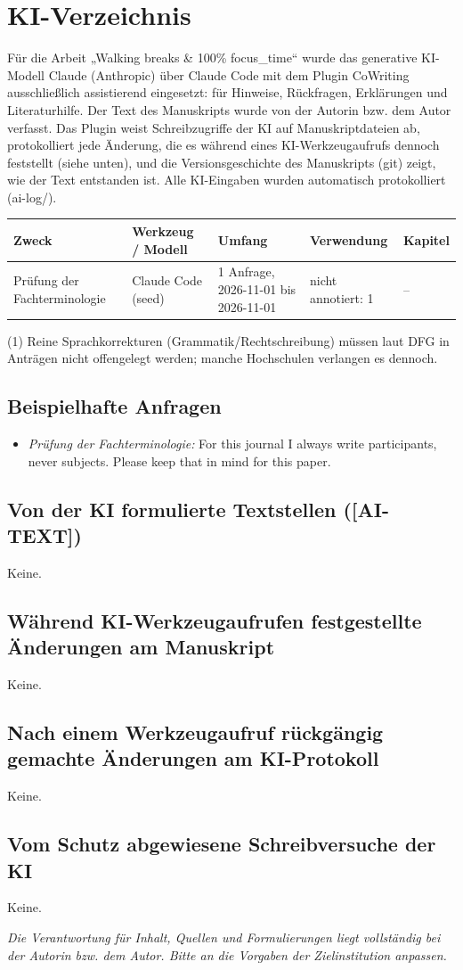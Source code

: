 \section*{KI-Verzeichnis}

Für die Arbeit „Walking breaks \& 100\% focus\_time“ wurde das generative KI-Modell Claude (Anthropic) über Claude Code mit dem Plugin CoWriting ausschließlich assistierend eingesetzt: für Hinweise, Rückfragen, Erklärungen und Literaturhilfe. Der Text des Manuskripts wurde von der Autorin bzw. dem Autor verfasst. Das Plugin weist Schreibzugriffe der KI auf Manuskriptdateien ab, protokolliert jede Änderung, die es während eines KI-Werkzeugaufrufs dennoch feststellt (siehe unten), und die Versionsgeschichte des Manuskripts (git) zeigt, wie der Text entstanden ist. Alle KI-Eingaben wurden automatisch protokolliert (ai-log/).

\begin{tabular}{p{.22\linewidth}p{.18\linewidth}p{.2\linewidth}p{.2\linewidth}p{.1\linewidth}}
\hline
\textbf{Zweck} & \textbf{Werkzeug / Modell} & \textbf{Umfang} & \textbf{Verwendung} & \textbf{Kapitel} \\
\hline
Prüfung der Fachterminologie & Claude Code (seed) & 1 Anfrage, 2026-11-01 bis 2026-11-01 & nicht annotiert: 1 & – \\
\hline
\end{tabular}

\noindent(1) Reine Sprachkorrekturen (Grammatik/Rechtschreibung) müssen laut DFG in Anträgen nicht offengelegt werden; manche Hochschulen verlangen es dennoch.

\subsection*{Beispielhafte Anfragen}
\begin{itemize}
  \item \textit{Prüfung der Fachterminologie:} For this journal I always write participants, never subjects. Please keep that in mind for this paper.
\end{itemize}
\subsection*{Von der KI formulierte Textstellen ([AI-TEXT])}
Keine.
\subsection*{Während KI-Werkzeugaufrufen festgestellte Änderungen am Manuskript}
Keine.
\subsection*{Nach einem Werkzeugaufruf rückgängig gemachte Änderungen am KI-Protokoll}
Keine.
\subsection*{Vom Schutz abgewiesene Schreibversuche der KI}
Keine.

\textit{Die Verantwortung für Inhalt, Quellen und Formulierungen liegt vollständig bei der Autorin bzw. dem Autor. Bitte an die Vorgaben der Zielinstitution anpassen.}
